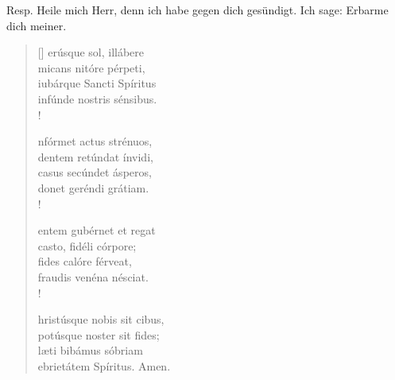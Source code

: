 


\def\greinitialformat#1{{\fontsize{40}{40}\selectfont #1}}
\resp


Resp. Heile mich Herr, denn ich habe gegen dich gesündigt. Ich sage: Erbarme dich meiner.


\vspace{0.3cm}


\def\greinitialformat#1{{\fontsize{40}{40}\selectfont #1}}
\gresetfirstlineaboveinitial{\small \textcolor{red}{hieme}}{}
\setaboveinitialseparation{0.72mm}


\begin{verse}[\versewidth]
erúsque sol, illábere\\
micans nitóre pérpeti, \\
iubárque Sancti Spíritus\\
infúnde nostris sénsibus.\\!

nfórmet actus strénuos, \\
dentem retúndat ínvidi,\\
casus secúndet ásperos, \\
donet geréndi grátiam.\\!

entem gubérnet et regat\\
casto, fidéli córpore;\\
fides calóre férveat, \\
fraudis venéna nésciat.\\!

hristúsque nobis sit cibus, \\
potúsque noster sit fides;\\
læti bibámus sóbriam\\
ebrietátem Spíritus. Amen.\\

\end{verse}





